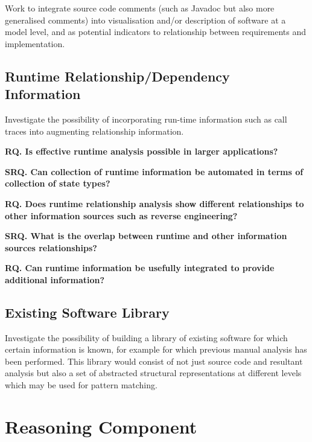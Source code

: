 Work to integrate source code comments (such as Javadoc but also more generalised comments) into visualisation and/or description of software at a model level, and as potential indicators to relationship between requirements and implementation.

\subsection{Runtime Relationship/Dependency Information}

Investigate the possibility of incorporating run-time information such as call traces into augmenting relationship information.

\textbf{RQ. Is effective runtime analysis possible in larger applications?}

\textbf{SRQ. Can collection of runtime information be automated in terms of collection of state types?}

\textbf{RQ. Does runtime relationship analysis show different relationships to other information sources such as reverse engineering?}

\textbf{SRQ. What is the overlap between runtime and other information sources relationships?}

\textbf{RQ. Can runtime information be usefully integrated to provide additional information?}

\subsection{Existing Software Library}

Investigate the possibility of building a library of existing software for which certain information is known, for example for which previous manual analysis has been performed. This library would consist of not just source code and resultant analysis but also a set of abstracted structural representations at different levels which may be used for pattern matching.

\section{Reasoning Component}

